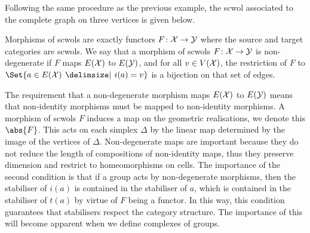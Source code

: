 \begin{example}
	Following the same procedure as the previous example, the scwol associated to the complete graph on three vertices is given below.
	\begin{center}
	\end{center}
	\label{eg:K3_scwol}
\end{example}


\begin{definition}
	Morphisms of scwols are exactly functors $F \colon \mathcal{X} \to \mathcal{Y}$ where the source and target categories are scwols.
	We say that a morphism of scwols $F \colon \mathcal{X} \to \mathcal{Y}$ is non-degenerate if $F$ maps $E(\mathcal{X})$ to  $E(\mathcal{Y})$, and for all $v \in V(\mathcal{X})$, the restriction of  $F$ to $\Set{a \in E(\calx) \given i(a) = v}$ is a bijection on that set of edges.
\end{definition}


The requirement that a non-degenerate morphism maps $E(\mathcal{X})$ to $E(\mathcal{Y})$ means that non-identity morphisms must be mapped to non-identity morphisms.
A morphism of scwols $F$ induces a map on the geometric realisations, we denote this $\abs{F}$.
This acts on each simplex $\Delta$ by the linear map determined by the image of the vertices of $\Delta$.
Non-degenerate maps are important because they do not reduce the length of compositions of non-identity maps, thus they preserve dimension and restrict to homeomorphisms on cells.
The importance of the second condition is that if a group acts by non-degenerate morphisms, then the stabiliser of $i(a)$ is contained in the stabiliser of $a$, which is contained in the stabiliser of $t(a)$ by virtue of $F$  being a functor.
In this way, this condition guarantees that stabilisers respect the category structure.
The importance of this will become apparent when we define complexes of groups.

